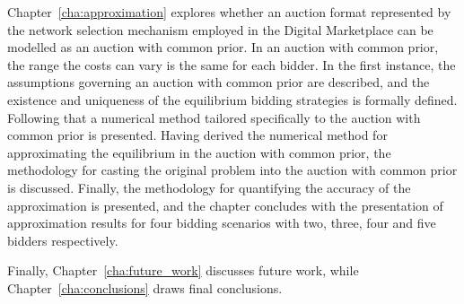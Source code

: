 Chapter~\ref{cha:approximation} explores whether an auction format represented by the network selection mechanism employed in the Digital Marketplace can be modelled as an auction with common prior. In an auction with common prior, the range the costs can vary is the same for each bidder. In the first instance, the assumptions governing an auction with common prior are described, and the existence and uniqueness of the equilibrium bidding strategies is formally defined. Following that a numerical method tailored specifically to the auction with common prior is presented. Having derived the numerical method for approximating the equilibrium in the auction with common prior, the methodology for casting the original problem into the auction with common prior is discussed. Finally, the methodology for quantifying the accuracy of the approximation is presented, and the chapter concludes with the presentation of approximation results for four bidding scenarios with two, three, four and five bidders respectively.

Finally, Chapter~\ref{cha:future_work} discusses future work, while Chapter~\ref{cha:conclusions} draws final conclusions.

